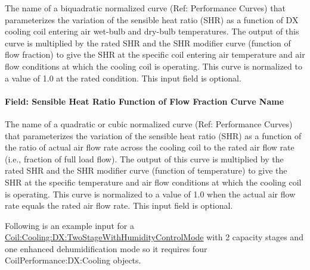 The name of a biquadratic normalized curve (Ref: Performance Curves) that parameterizes the variation of the sensible heat ratio (SHR) as a function of DX cooling coil entering air wet-bulb and dry-bulb temperatures. The output of this curve is multiplied by the rated SHR and the SHR modifier curve (function of flow fraction) to give the SHR at the specific coil entering air temperature and air flow conditions at which the cooling coil is operating. This curve is normalized to a value of 1.0 at the rated condition. This input field is optional.

\paragraph{Field: Sensible Heat Ratio Function of Flow Fraction Curve Name}\label{field-sensible-heat-ratio-function-of-flow-fraction-curve-name-2}

The name of a quadratic or cubic normalized curve (Ref: Performance Curves) that parameterizes the variation of the sensible heat ratio (SHR) as a function of the ratio of actual air flow rate across the cooling coil to the rated air flow rate (i.e., fraction of full load flow). The output of this curve is multiplied by the rated SHR and the SHR modifier curve (function of temperature) to give the SHR at the specific temperature and air flow conditions at which the cooling coil is operating. This curve is normalized to a value of 1.0 when the actual air flow rate equals the rated air flow rate. This input field is optional.

Following is an example input for a \hyperref[coilcoolingdxtwostagewithhumiditycontrolmode]{Coil:Cooling:DX:TwoStageWithHumidityControlMode} with 2 capacity stages and one enhanced dehumidification mode so it requires four CoilPerformance:DX:Cooling objects.

